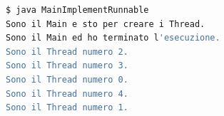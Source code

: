 \begin{lstlisting}[language=Bash]
$ java MainImplementRunnable
Sono il Main e sto per creare i Thread.
Sono il Main ed ho terminato l'esecuzione.
Sono il Thread numero 2.
Sono il Thread numero 3.
Sono il Thread numero 0.
Sono il Thread numero 4.
Sono il Thread numero 1.
\end{lstlisting}
